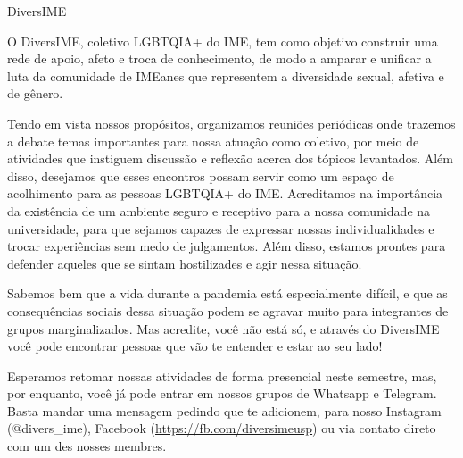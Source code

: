 \begin{subsecao}{DiversIME}


O DiversIME, coletivo LGBTQIA+ do IME, tem como objetivo construir uma rede de
apoio, afeto e troca de conhecimento, de modo a amparar e unificar a luta da
comunidade de IMEanes que representem a diversidade sexual, afetiva e de gênero. 

Tendo em vista nossos propósitos, organizamos reuniões periódicas onde trazemos
a debate temas importantes para nossa atuação como coletivo, por meio de
atividades que instiguem discussão e reflexão acerca dos tópicos levantados.
Além disso, desejamos que esses encontros possam servir como um espaço de
acolhimento para as pessoas LGBTQIA+ do IME. Acreditamos na importância da
existência de um ambiente seguro e receptivo para a nossa comunidade na
universidade, para que sejamos capazes de expressar nossas individualidades
e trocar experiências sem medo de julgamentos. Além disso, estamos prontes
para defender aqueles que se sintam hostilizades e agir nessa situação. 

Sabemos bem que a vida durante a pandemia está especialmente difícil, e que %
as consequências sociais dessa situação podem se agravar muito para integrantes
de grupos marginalizados. Mas acredite, você não está só, e através do DiversIME
você pode encontrar pessoas que vão te entender e estar ao seu lado!

Esperamos retomar nossas atividades de forma presencial neste semestre, mas, %
por enquanto, você já pode entrar em nossos grupos de Whatsapp e Telegram.
Basta mandar uma mensagem pedindo que te adicionem, para nosso Instagram
(@divers_ime), Facebook (\url{https://fb.com/diversimeusp}) ou via contato direto
com um des nosses membres.

\end{subsecao}
